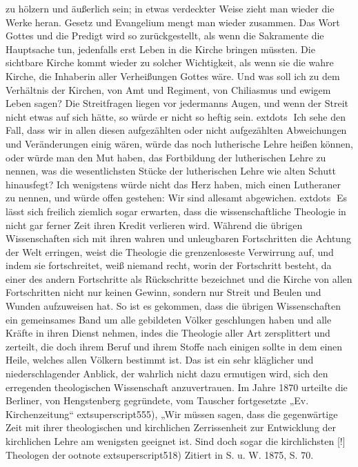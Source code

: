 zu hölzern und äußerlich sein; in etwas verdeckter Weise zieht man wieder die Werke heran. Gesetz und Evangelium mengt man wieder zusammen. Das Wort Gottes und die Predigt wird so zurückgestellt, als wenn die Sakramente die Hauptsache tun, jedenfalls erst Leben in die Kirche bringen müssten. Die sichtbare Kirche kommt wieder zu solcher Wichtigkeit, als wenn sie die wahre Kirche, die Inhaberin aller Verheißungen Gottes wäre. Und was soll ich zu dem Verhältnis der Kirchen, von Amt und Regiment, von Chiliasmus und ewigem Leben sagen? Die Streitfragen liegen vor jedermanns Augen, und wenn der Streit nicht etwas auf sich hätte, so würde er nicht so heftig sein. 	extdots Ich sehe den Fall, dass wir in allen diesen aufgezählten oder nicht aufgezählten Abweichungen und Veränderungen einig wären, würde das noch lutherische Lehre heißen können, oder würde man den Mut haben, das Fortbildung der lutherischen Lehre zu nennen, was die wesentlichsten Stücke der lutherischen Lehre wie alten Schutt hinausfegt? Ich wenigstens würde nicht das Herz haben, mich einen Lutheraner zu nennen, und würde offen gestehen: Wir sind allesamt abgewichen. 	extdots Es lässt sich freilich ziemlich sogar erwarten, dass die wissenschaftliche Theologie in nicht gar ferner Zeit ihren Kredit verlieren wird. Während die übrigen Wissenschaften sich mit ihren wahren und unleugbaren Fortschritten die Achtung der Welt erringen, weist die Theologie die grenzenloseste Verwirrung auf, und indem sie fortschreitet, weiß niemand recht, worin der Fortschritt besteht, da einer des andern Fortschritte als Rückschritte bezeichnet und die Kirche von allen Fortschritten nicht nur keinen Gewinn, sondern nur Streit und Beulen und Wunden aufzuweisen hat. So ist es gekommen, dass die übrigen Wissenschaften ein gemeinsames Band um alle gebildeten Völker geschlungen haben und alle Kräfte in ihren Dienst nehmen, indes die Theologie aller Art zersplittert und zerteilt, die doch ihrem Beruf und ihrem Stoffe nach einigen sollte in dem einen Heile, welches allen Völkern bestimmt ist. Das ist ein sehr kläglicher und niederschlagender Anblick, der wahrlich nicht dazu ermutigen wird, sich den erregenden theologischen Wissenschaft anzuvertrauen. Im Jahre 1870 urteilte die Berliner, von Hengstenberg gegründete, vom Tauscher fortgesetzte „Ev. Kirchenzeitung“	extsuperscript{555)}, „Wir müssen sagen, dass die gegenwärtige Zeit mit ihrer theologischen und kirchlichen Zerrissenheit zur Entwicklung der kirchlichen Lehre am wenigsten geeignet ist. Sind doch sogar die kirchlichsten [!] Theologen derootnote{	extsuperscript{518)} Zitiert in S. u. W. 1875, S. 70.}